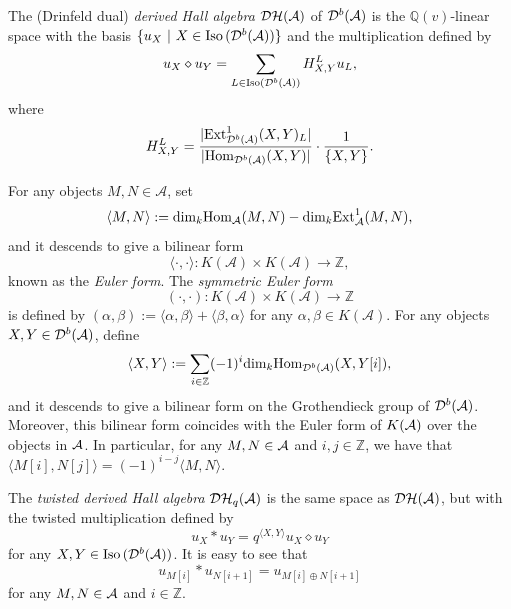 \documentclass[reqno,12pt]{amsart}
\numberwithin{equation}{section}
\def\Ext{\mbox{\rm Ext}} \def\Hom{\mbox{\rm Hom}} \def\dim{\mbox{\rm dim}} \def\Iso{\mbox{\rm Iso}\,}\def\Ind{\mbox{\rm Ind}\,}
\def\lr#1{\langle #1\rangle} \def\fin{\hfill$\square$}  \def\lra{\longrightarrow} \def\mod{\mbox{\rm \textbf{mod}}\,}\def\Mod{\mbox{\rm mod}\,}\def\top{\mbox{\rm top}\,}\def\soc{\mbox{\rm soc}\,}
\theoremstyle{plain} %
\theoremstyle{definition} %
\begin{document}
The (Drinfeld dual) {\em derived Hall algebra} $\mathcal {D}\mathcal {H}(\mathcal{A})$ of $\mathcal{D}^b(\mathcal{A})$ is the $\mathbb{Q}(v)$-linear space with the basis $\{u_{X}~|~X\in \Iso(\mathcal{D}^b(\A))\}$ and the multiplication defined by
$$u_{X}\diamond  u_{Y}=\sum\limits_{L\in {\rm Iso}(\mathcal{D}^b(\mathcal{A}))}H_{X,Y}^Lu_{L},$$ where
$$H_{X,Y}^L=\frac{|\Ext^1_{\mathcal{D}^b(\A)}(X,Y)_{L}|}{|\Hom_{\mathcal{D}^b(\A)}(X,Y)|}\cdot\frac{1}{\{X,Y\}}.$$

For any objects $M,N \in \mathcal{A}$, set $$\lr{M,N}:=\dim_k\Hom_{\A}(M,N)-\dim_k\Ext^1_{\A}(M,N),$$
and it descends to give a bilinear form
$$\lr{\cdot ,\cdot }: K(\mathcal{A})\times K(\mathcal{A})\longrightarrow \mathbb{Z},$$ known as the \emph{Euler form}. The \emph{symmetric Euler form} $$(\cdot ,\cdot ): K(\mathcal{A})\times K(\mathcal{A})\longrightarrow \mathbb{Z}$$
is defined by $(\alpha,\beta):=\lr{\alpha,\beta}+\lr{\beta,\alpha}$ for any $\alpha,\beta\in K(\mathcal{A})$.
For any objects ${X},{Y}\in \mathcal{D}^b(\mathcal{A})$, define
\begin{equation*}
\lr{{X},{Y}}:=\sum\limits_{i\in\mathbb{Z}}(-1)^i\dim_k\Hom_{\mathcal{D}^b(\A)}({X},{Y}[i]),
\end{equation*}
and it descends to give a bilinear form on the Grothendieck group of $\mathcal{D}^b(\mathcal{A})$. Moreover, this bilinear form coincides with the Euler form of $K(\mathcal{A})$ over the objects in $\mathcal{A}$. In particular, for any $M,N\in\mathcal{A}$ and $i,j\in\mathbb{Z}$, we have that $\lr{M[i],N[j]}=(-1)^{i-j}\lr{M,N}$.

The \emph{twisted derived Hall algebra} $\mathcal {D}\mathcal {H}_{q}(\mathcal{A})$ is the same space as $\mathcal {D}\mathcal {H}(\mathcal{A})$, but with the twisted multiplication defined by
\begin{equation}u_{X}\ast u_{Y}=q^{\lr{{X},{Y}}} u_{X}\diamond u_{Y}\end{equation}
for any ${X},{Y}\in \Iso(\mathcal{D}^b(\A))$. It is easy to see that \begin{equation*}u_{M[i]}\ast u_{N[i+1]}=u_{M[i]\oplus N[i+1]}\end{equation*}
for any $M,N\in\mathcal{A}$ and $i\in\mathbb{Z}$.
\end{document}
